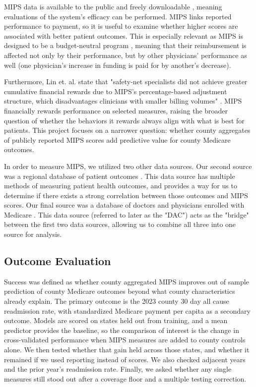 \documentclass[12pt]{article}
\begin{document}
MIPS data is available to the public and freely downloadable \cite{2023PYAttestations}, meaning evaluations of the system's efficacy can be performed. MIPS links reported performance to payment, so it is useful to examine whether higher scores are associated with better patient outcomes. This is especially relevant as MIPS is designed to be a budget-neutral program \cite{Gettel2022TheSystem}, meaning that their reimbursement is affected not only by their performance, but by other physicians' performance as well (one physician's increase in funding is paid for by another's decrease).

Furthermore, Lin et. al. state that "safety-net specialists did not achieve greater cumulative financial rewards due to MIPS's percentage-based adjustment structure, which disadvantages clinicians with smaller billing volumes" \cite{Lin2025Merit-BasedYears}. MIPS financially rewards performance on selected measures, raising the broader question of whether the behaviors it rewards always align with what is best for patients. This project focuses on a narrower question: whether county aggregates of publicly reported MIPS scores add predictive value for county Medicare outcomes.

In order to measure MIPS, we utilized two other data sources. Our second source was a regional database of patient outcomes \cite{2026MedicareCounty}. This data source has multiple methods of measuring patient health outcomes, and provides a way for us to determine if there exists a strong correlation between those outcomes and MIPS scores. Our final source was a database of doctors and physicians enrolled with Medicare \cite{2023DoctorsFile}. This data source (referred to later as the "DAC") acts as the "bridge" between the first two data sources, allowing us to combine all three into one source for analysis.

\subsection{Outcome Evaluation}
Success was defined as whether county aggregated MIPS improves out of sample prediction of county Medicare outcomes beyond what county characteristics already explain. The primary outcome is the 2023 county 30 day all cause readmission rate, with standardized Medicare payment per capita as a secondary outcome. Models are scored on states held out from training, and a mean predictor provides the baseline, so the comparison of interest is the change in cross-validated performance when MIPS measures are added to county controls alone. We then tested whether that gain held across those states, and whether it remained if we used reporting instead of scores. We also checked adjacent years and the prior year's readmission rate. Finally, we asked whether any single measures still stood out after a coverage floor and a multiple testing correction.
\end{document}
